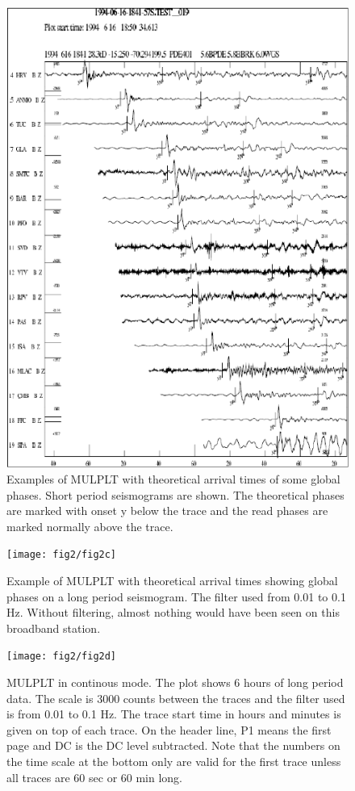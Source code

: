 \begin{figure}
\centerline{\includegraphics[width=0.9\linewidth]{fig/fig18}}
\caption{Examples of MULPLT with theoretical arrival times of some global phases. Short period seismograms are shown. The theoretical phases are marked with onset y below the trace and the read phases are marked normally above the trace. 
}
\end{figure}

\begin{figure}
\centerline{\texttt{[image: fig2/fig2c]}}
\caption{Example of MULPLT with theoretical arrival times showing global phases on a long period seismogram. The filter used from 0.01 to 0.1 Hz. Without filtering, almost nothing would have been seen on this broadband station. 
}
\label{fig:mulplt-iasp}
\end{figure}

\begin{figure}
\centerline{\texttt{[image: fig2/fig2d]}}
\caption{MULPLT in continous mode.\newline
The plot shows 6 hours of long period data. The scale is 3000 counts 
between the traces and the filter used is from 0.01 to 0.1 Hz. The 
trace start time in hours and minutes is given on top of each trace. 
On the header line, P1 means the first page and DC is the DC level 
subtracted. Note that the numbers on the time scale at the bottom 
only are valid for the first trace unless all traces are 60 sec or 
60 min long.}
\label{fig:mulplt-cont}
\end{figure}

